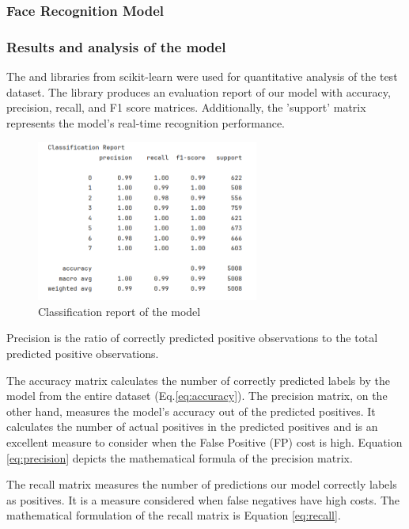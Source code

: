 \subsubsection*{Face Recognition Model}




\subsubsection*{Results and analysis of the model}

The   and   libraries from scikit-learn were used for quantitative analysis of the test dataset. The  library produces an evaluation report of our model with accuracy, precision, recall, and F1 score matrices. Additionally, the 'support' matrix represents the model's real-time recognition performance.


\begin{figure}
	\centering
	\includegraphics[width = 0.65\textwidth]{images/classific_report.png}
	\caption{Classification report of the model}
	\label{fig:report}
\end{figure}


Precision is the ratio of correctly predicted positive observations to the total predicted positive observations.

The accuracy matrix calculates the number of correctly predicted labels by the model from the entire dataset (Eq.\ref{eq:accuracy}). 
The precision matrix, on the other hand, measures the model's accuracy out of the predicted positives. It calculates the number of actual positives in the predicted positives and is an excellent measure to consider when the False Positive (FP) cost is high. Equation \ref{eq:precision} depicts the mathematical formula of the precision matrix.

The recall matrix measures the number of predictions our model correctly labels as positives. It is a measure considered when false negatives have high costs. The mathematical formulation of the recall matrix is Equation \ref{eq:recall}. 

